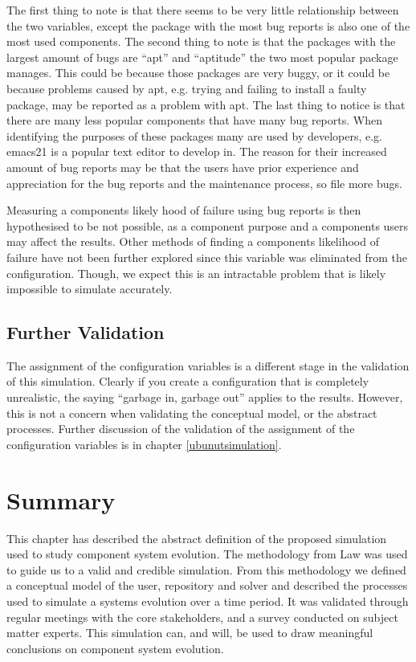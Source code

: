 The first thing to note is that there seems to be very little relationship between the two variables, except the package with the most bug reports is also one of the most used components.
The second thing to note is that the packages with the largest amount of bugs are ``apt'' and ``aptitude'' the two most popular package manages.
This could be because those packages are very buggy, or it could be because problems caused by apt, e.g. trying and failing to install a faulty package, may be reported as a problem with apt. 
The last thing to notice is that there are many less popular components that have many bug reports.
When identifying the purposes of these packages many are used by developers, e.g. emacs21 is a popular text editor to develop in.
The reason for their increased amount of bug reports may be that the users have prior experience and appreciation for the bug reports and the maintenance process, so file more bugs.

Measuring a components likely hood of failure using bug reports is then hypothesised to be not possible,
as a component purpose and a components users may affect the results.
Other methods of finding a components likelihood of failure have not been further explored since this variable was eliminated from the configuration.
Though, we expect this is an intractable problem that is likely impossible to simulate accurately.

\subsection{Further Validation}
The assignment of the configuration variables is a different stage in the validation of this simulation.
Clearly if you create a configuration that is completely unrealistic, the saying ``garbage in, garbage out'' applies to the results.
However, this is not a concern when validating the conceptual model, or the abstract processes.
Further discussion of the validation of the assignment of the configuration variables is in chapter \ref{ubunutsimulation}.

\section{Summary}
{}This chapter has described the abstract definition of the proposed simulation used to study component system evolution.
{}The methodology from Law \cite{Law2005} was used to guide us to a valid and credible simulation.
{}From this methodology we defined a conceptual model of the user, repository and solver and described the processes used to simulate a systems evolution over a time period.
{}It was validated through regular meetings with the core stakeholders, and a survey conducted on subject matter experts.
{}This simulation can, and will, be used to draw meaningful conclusions on component system evolution.
